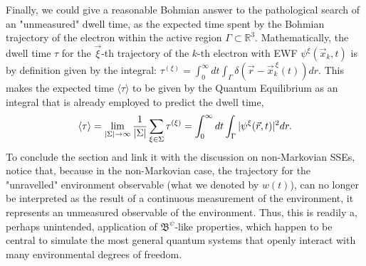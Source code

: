 \documentclass[11pt, a4paper]{article} %
\newcommand{\R}{\mathbb{R}} %
\newcommand{\B}{\mathfrak{B}}
\begin{document}
Finally, we could give a reasonable Bohmian answer to the pathological search of an "unmeasured" dwell time, as the expected time spent by the Bohmian trajectory of the electron within the active region $\Gamma\subset \R^3$. Mathematically, the dwell time $\tau$ for the $\vec{\xi}$-th trajectory of the $k$-th electron with EWF $\psi^\xi(\vec{x}_k,t)$ is by definition given by the integral: $\tau^{( \xi)}= \int_{0}^\infty  dt \int_\Gamma \delta(\vec{r}-\vec{x}_k^{\:\xi}(t)) dr$. This makes the expected time $\langle \tau\rangle$ to be given by the Quantum Equilibrium as an integral that is already employed to predict the dwell time,\vspace{-0.15cm}
\begin{equation}
\langle \tau \rangle = \lim_{|\Sigma|\rightarrow \infty}\frac{1}{|\Sigma|} \sum_{\xi\in\Sigma} \tau^{(\xi)} = \int_{0}^\infty dt \int_\Gamma |\psi^\xi(\vec{r},t)|^2dr.\vspace{-0.2cm}
\end{equation}
To conclude the section and link it with the discussion on non-Markovian SSEs, notice that, because in the non-Markovian case, the trajectory for the "unravelled" environment observable (what we denoted by $w(t)$), can no longer be interpreted as the result of a continuous measurement of the environment, it represents an unmeasured observable of the environment. Thus, this is readily a, perhaps unintended, application of $\B^\psi$-like properties, which happen to be central to simulate the most general quantum systems that openly interact with many environmental degrees of freedom. \vspace{-0.2cm}
\end{document}
